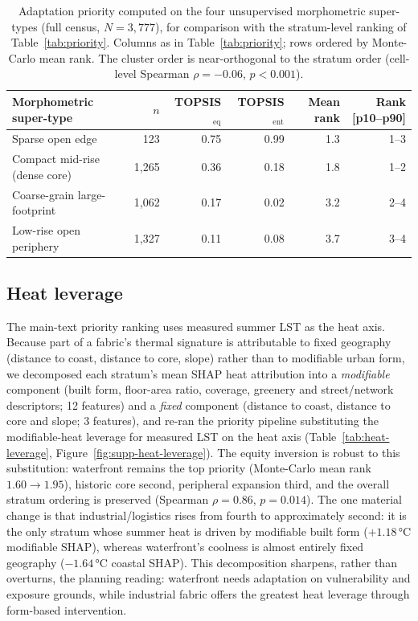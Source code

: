 \begin{table}[htbp]
  \centering\footnotesize
  \caption{Adaptation priority computed on the four unsupervised morphometric super-types (full census, $N=3{,}777$),
  for comparison with the stratum-level ranking of Table~\ref{tab:priority}. Columns as in Table~\ref{tab:priority};
  rows ordered by Monte-Carlo mean rank. The cluster order is near-orthogonal to the stratum order (cell-level
  Spearman $\rho = -0.06$, $p < 0.001$).}
  \label{tab:cluster-priority}
  \begin{tabular}{@{}lrrrrr@{}}
    \toprule
    Morphometric super-type & $n$ & TOPSIS$_\text{eq}$ & TOPSIS$_\text{ent}$ & Mean rank & Rank [p10--p90] \\
    \midrule
    Sparse open edge              & 123   & 0.75 & 0.99 & 1.3 & 1--3 \\
    Compact mid-rise (dense core) & 1{,}265 & 0.36 & 0.18 & 1.8 & 1--2 \\
    Coarse-grain large-footprint  & 1{,}062 & 0.17 & 0.02 & 3.2 & 2--4 \\
    Low-rise open periphery       & 1{,}327 & 0.11 & 0.08 & 3.7 & 3--4 \\
    \bottomrule
  \end{tabular}
\end{table}

\subsection{Heat leverage}
\label{app:heat-leverage}
The main-text priority ranking uses measured summer LST as the heat axis. Because part of a fabric's thermal
signature is attributable to fixed geography (distance to coast, distance to core, slope) rather than to
modifiable urban form, we decomposed each stratum's mean SHAP heat attribution into a \emph{modifiable} component
(built form, floor-area ratio, coverage, greenery and street/network descriptors; 12 features) and a \emph{fixed}
component (distance to coast, distance to core and slope; 3 features), and re-ran the priority pipeline substituting
the modifiable-heat leverage for measured LST on the heat axis (Table~\ref{tab:heat-leverage},
Figure~\ref{fig:supp-heat-leverage}). The equity inversion is robust to this substitution: waterfront remains the
top priority (Monte-Carlo mean rank $1.60 \rightarrow 1.95$), historic core second, peripheral expansion third,
and the overall stratum ordering is preserved (Spearman $\rho = 0.86$, $p = 0.014$). The one material change is
that industrial/logistics rises from fourth to approximately second: it is the only stratum whose summer heat is
driven by modifiable built form ($+1.18\,\si{\celsius}$ modifiable SHAP), whereas waterfront's coolness is almost
entirely fixed geography ($-1.64\,\si{\celsius}$ coastal SHAP). This decomposition sharpens, rather than
overturns, the planning reading: waterfront needs adaptation on vulnerability and exposure grounds, while
industrial fabric offers the greatest heat leverage through form-based intervention.

